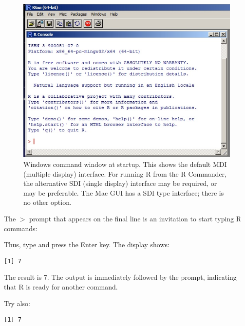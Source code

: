 \begin{figure}
\includegraphics[trim=0 18 0 0]{figs-inc/01i-gui.jpg}
\caption{Windows command window at startup. This shows the default MDI
  (multiple display) interface. For running R from the R Commander,
  the alternative SDI (single display) interface may be required, or
  may be preferable.  The Mac GUI has a SDI type interface; there is
  no other option.}
\end{figure}

\noindent
The \texttt{$>$} prompt that appears on the final line
is an invitation to start typing R commands:

Thus, type  and press the Enter key.
The display shows:
\begin{knitrout}
\color{fgcolor}\begin{kframe}
\begin{alltt}
\hlstd{> }\hlopt{+}
\end{alltt}
\begin{verbatim}
[1] 7
\end{verbatim}
\end{kframe}
\end{knitrout}
\noindent
{}
The result is 7. The output is immediately followed by the \txtt{>}
prompt, indicating that R is ready for another command.

Try also:
\begin{knitrout}
\color{fgcolor}\begin{kframe}
\begin{alltt}
\hlstd{> } \hlkwb{<-} \hlopt{+}
\hlstd{> }
\end{alltt}
\begin{verbatim}
[1] 7
\end{verbatim}
\end{kframe}
\end{knitrout}

